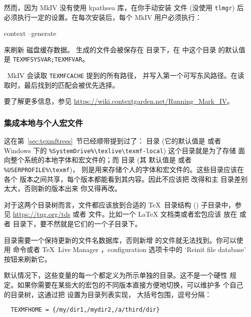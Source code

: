 \documentclass{article}
\begin{document}
然而，因为 \ConTeXt{} MkIV 没有使用 kpathsea 库，在你手动安装
文件 (没使用 \verb+tlmgr+) 后必须执行一定的设置。在每次安装后，每个
MkIV 用户必须执行：

\begin{sverbatim}
  context --generate
\end{sverbatim}
来刷新 \ConTeXt{} 磁盘缓存数据。
生成的文件会被保存在  目录下，在 \TL{} 中这个目录
的默认值是 \verb+TEXMFSYSVAR;TEXMFVAR+。

\ConTeXt\ MkIV 会读取 \verb+TEXMFCACHE+ 提到的所有路径，
并写入第一个可写东风路径。在读取时，最后找到的匹配会被优先选择。

要了解更多信息，参见
\url{https://wiki.contextgarden.net/Running_Mark_IV}。

\subsubsection{集成本地与个人宏文件}
\label{sec:local-personal-macros}

这在第~\ref{sec:texmftrees}~节已经顺带提到过了：
目录 (它的默认值是  或者
Windows 下的 \verb|%SystemDrive%\texlive\texmf-local|) 这个目录就是为了存储
面向整个系统的本地字体和宏文件的；而  目录 (其
默认值是  或者 \verb|%USERPROFILE%\texmf|)，
则是用来存储个人的字体和宏文件的。这些目录应该在各个 \TL{}
版本之间共享，每个版本都能看到其内容。因此不应该把
 改得和主 \TL{} 目录差别太大，否则新的版本出来
你又得再改。

对于这两个目录树而言，文件都应该放到合适的 \TeX\ 目录结构 (\TDS)
子目录中，参见 \url{https://tug.org/tds} 或者
 文件。比如一个 \LaTeX{} 文档类或者宏包应该
放在  或者 
目录下，要不然就是它们的一个子目录下。

 目录需要一个保持更新的文件名数据库，否则新增
的文件就无法找到。你可以使用  命令或者
\TeX\ Live Manager \GUI{}，configuration 选项卡中的
`Reinit file database' 按钮来刷新它。

默认情况下，这些变量的每一个都定义为所示单独的目录。这不是一个硬性
规定。如果你需要在某些大的宏包的不同版本直接方便地切换，可以维护多
个自己的目录树，这通过把  设置为目录列表实现，
大括号包围，逗号分隔：

\begin{verbatim}
  TEXMFHOME = {/my/dir1,/mydir2,/a/third/dir}
\end{verbatim}
\end{document}
